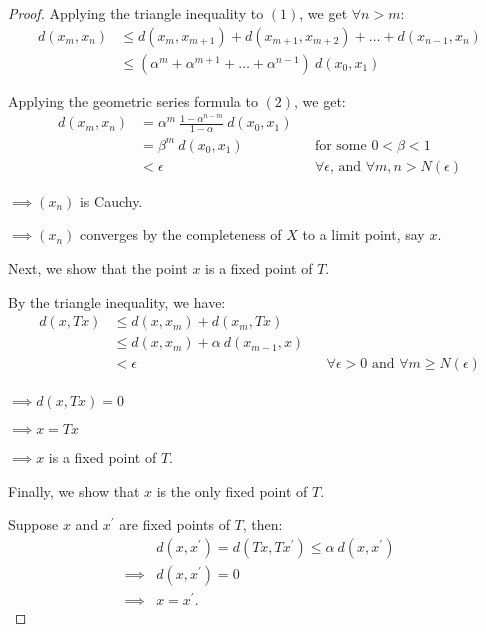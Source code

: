 \documentclass{article}
\theoremstyle{definition}
\begin{document}
\begin{proof}
  Applying the triangle inequality to $(1)$, we get $\forall n > m$:
  \begin{align}
    d(x_m, x_n) 
    &\leq d(x_{m}, x_{m+1}) + d(x_{m+1}, x_{m+2}) + \ldots + d(x_{n-1}, x_{n}) \nonumber \\
    &\leq (\alpha^{m} + \alpha^{m+1} + \ldots + \alpha^{n-1}) \: d(x_0, x_1)
  \end{align}

  Applying the geometric series formula to $(2)$, we get:
  \begin{align*}
    d(x_m, x_n)
    &= \alpha^m \: \frac{1-\alpha^{n-m}}{1-\alpha} \: d(x_0, x_1) \\
    &= \beta^m \: d(x_0, x_1) &&\text{for some $0 < \beta < 1$} \\
    &< \epsilon &&\text{$\forall \epsilon$, and $\forall m,n > N(\epsilon)$}
  \end{align*}

  \noindent
  $\implies (x_n)$ is Cauchy.

  \noindent
  $\implies (x_n)$ converges by the completeness of $X$ to a limit point, say $x$.
  \newline

  Next, we show that the point $x$ is a fixed point of $T$.

  By the triangle inequality, we have:
  \begin{align*}
    d(x, Tx) 
    &\leq d(x, x_m) + d(x_m, Tx) \\
    &\leq d(x, x_m) + \alpha \: d(x_{m-1}, x) \\
    &< \epsilon && \text{$\forall \epsilon > 0$ and $\forall m \geq N(\epsilon)$}  \\
  \end{align*}

  \noindent
  $\implies d(x, Tx) = 0$

  \noindent
  $\implies x = Tx$

  \noindent
  $\implies x$ is a fixed point of $T$. 
  \newline

  Finally, we show that $x$ is the only fixed point of $T$.

  Suppose $x$ and $x^\prime$ are fixed points of $T$, then:
  \begin{align*}
    &d(x, x^\prime) = d(Tx, Tx^\prime) \leq \alpha \: d(x, x^\prime) \\
    \implies& d(x, x^\prime) = 0 \\
    \implies& x = x^\prime.
  \end{align*}
  
\end{proof}
\end{document}
